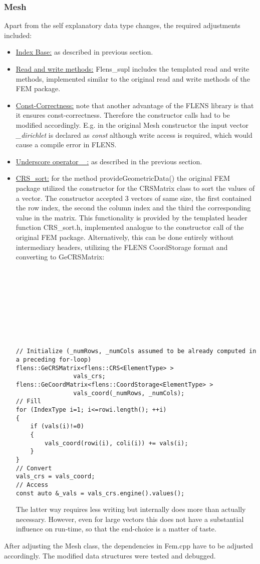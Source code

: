 \subsubsection{Mesh}
Apart from the self explanatory data type changes, the required adjustments included:
\begin{itemize}
\item \underline{Index Base:} as described in previous section.
\item \underline{Read and write methods:} Flens\_supl includes the templated read and write methods, implemented similar to the original read and write methods of the FEM package.
\item \underline{Const-Correctness:} note that another advantage of the FLENS library is that it ensures const-correctness. Therefore the constructor calls had to be modified accordingly. E.g. in the original Mesh constructor the input vector \emph{\_dirichlet} is declared as \emph{const} although write access is required, which would cause a compile error in FLENS.
\item \underline{Underscore operator \textbf{\_}:} as described in the previous section.
\item \underline{CRS\_sort:} for the method provideGeometricData() the original FEM package utilized the constructor for the CRSMatrix class to sort the values of a vector. The constructor accepted 3 vectors of same size, the first contained the row index, the second the column index and the third the corresponding value in the matrix. This functionality is provided by the templated header function CRS\_sort.h, implemented analogue to the constructor call of the original FEM package. Alternatively, this can be done entirely without intermediary headers, utilizing the FLENS CoordStorage format and converting to GeCRSMatrix:
\\\\\\\\\\\\\\\\\
\begin{lstlisting}
// Initialize (_numRows, _numCols assumed to be already computed in a preceding for-loop)
flens::GeCRSMatrix<flens::CRS<ElementType> >
				vals_crs;
flens::GeCoordMatrix<flens::CoordStorage<ElementType> >
				vals_coord(_numRows, _numCols);
// Fill
for (IndexType i=1; i<=rowi.length(); ++i)
{
	if (vals(i)!=0)
	{
		vals_coord(rowi(i), coli(i)) += vals(i);	
	}
}
// Convert
vals_crs = vals_coord;
// Access
const auto &_vals = vals_crs.engine().values();
\end{lstlisting}
The latter way requires less writing but internally does more than actually necessary. However, even for large vectors this does not have a substantial influence on run-time, so that the end-choice is a matter of taste.
\end{itemize}
After adjusting the Mesh class, the dependencies in Fem.cpp have to be adjusted accordingly. The modified data structures were tested and debugged.

